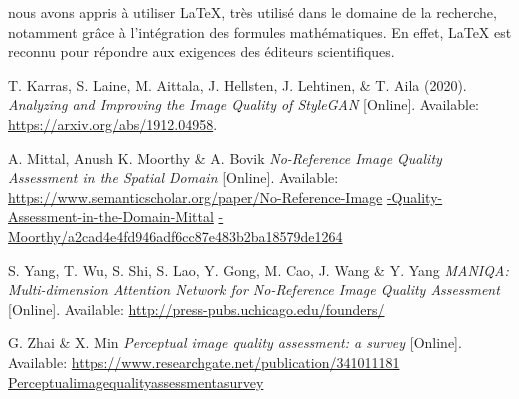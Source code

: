 \documentclass{ieeeaccess}
\begin{document}
 nous avons appris à utiliser LaTeX, très utilisé dans le domaine de la recherche, notamment grâce à l'intégration des formules mathématiques. En effet, LaTeX est reconnu pour répondre aux exigences des éditeurs scientifiques.

\begin{thebibliography}{00}

T. Karras, S. Laine, M. Aittala, J. Hellsten, J. Lehtinen, \& T. Aila (2020).
\emph{Analyzing and Improving the Image Quality of StyleGAN} [Online].
\newline
Available:
\underline{https://arxiv.org/abs/1912.04958}.

A. Mittal, Anush K. Moorthy \& A. Bovik
\emph{No-Reference Image Quality Assessment in the Spatial Domain} [Online].
\newline
Available:
\underline{https://www.semanticscholar.org/paper/No-Reference-Image}
\underline{-Quality-Assessment-in-the-Domain-Mittal}
\underline{-Moorthy/a2cad4e4fd946adf6cc87e483b2ba18579de1264}

S. Yang, T. Wu, S. Shi, S. Lao, Y. Gong, M. Cao, J. Wang \& Y. Yang
\emph{MANIQA: Multi-dimension Attention Network for No-Reference Image Quality Assessment} [Online].
\newline
Available:
\underline{http://press-pubs.uchicago.edu/founders/}

G. Zhai \& X. Min
\emph{Perceptual image quality assessment: a survey} [Online].
\newline
Available:
\underline{https://www.researchgate.net/publication/341011181}
\underline{\textunderscore Perceptual\textunderscore image\textunderscore quality\textunderscore assessment\textunderscore a\textunderscore survey}

\end{thebibliography}

\EOD
\end{document}
